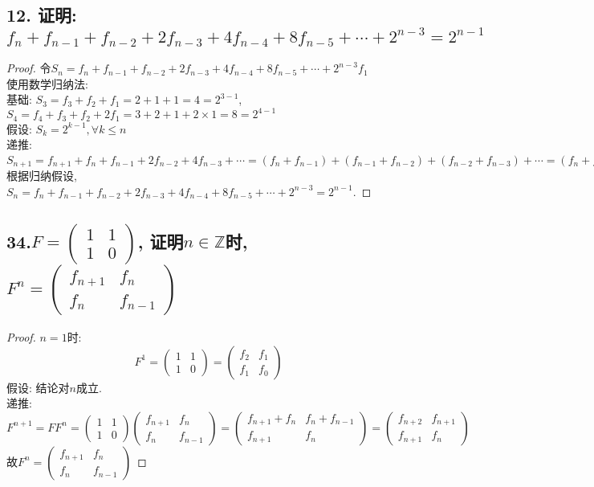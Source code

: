 \documentclass[UTF8, onecolumn, a4paper]{article}
\begin{document}
\subsection*{12. 证明: $f_n + f_{n-1} + f_{n-2} + 2f_{n-3} + 4f_{n-4} +8f_{n-5} + \cdots + 2^{n-3} = 2^{n-1}$}
\begin{proof}
令$S_n = f_n + f_{n-1} + f_{n-2} + 2f_{n-3} + 4f_{n-4} +8f_{n-5} + \cdots + 2^{n-3}f_1$\\
使用数学归纳法:\\
基础: $S_3 = f_3 + f_2 + f_1 = 2 + 1 + 1 = 4 = 2^{3 - 1}$, $S_4 = f_4 + f_3 + f_2  + 2f_1 = 3 + 2 + 1 + 2\times1 = 8 = 2^{4 - 1}$\\
假设: $S_k = 2^{k-1}, \forall k \leq n$\\
递推: $S_{n+1} = f_{n+1} + f_{n} + f_{n-1} + 2 f_{n-2} + 4f_{n-3} +\cdots = (f_{n} + f_{n-1}) + (f_{n-1} + f_{n-2}) + (f_{n-2} + f_{n-3}) + \cdots = (f_n + f_{n-1} + f_{n-2} + 2f_{n-3} + \cdots) + (f_{n-1} + f_{n-2} + f_{n-3} + 2f_{n-4}+\cdots) + 2^{n-2}f_1 = S_n + S_{n-1} + 2^{n-2} = 2^{n-1} + 2^{n-2} + 2^{n-2} = 2^n$\\
根据归纳假设,  $S_n = f_n + f_{n-1} + f_{n-2} + 2f_{n-3} + 4f_{n-4} +8f_{n-5} + \cdots + 2^{n-3} = 2^{n-1}$.
\end{proof}

\subsection*{34.$F = \begin{pmatrix}1& 1 \\1 &0 \end{pmatrix}$, 证明$n\in \mathbb{Z}$时, $F^n = \begin{pmatrix}f_{n+1}& f_{n} \\f_{n} &f_{n-1}\end{pmatrix}$}
\begin{proof}
$n = 1$时:
$$F^1 = \begin{pmatrix}1& 1 \\1 &0 \end{pmatrix} = \begin{pmatrix}f_2& f_1 \\f_1 &f_0 \end{pmatrix}$$
假设: 结论对$n$成立.\\
递推:
$$F^{n+1} = FF^n = \begin{pmatrix}1& 1 \\1 &0 \end{pmatrix} \begin{pmatrix}f_{n+1}& f_{n} \\f_{n} &f_{n-1} \end{pmatrix} = \begin{pmatrix}f_{n+1} + f_n& f_{n} + f_{n-1}\\ f_{n+1}&f_{n} \end{pmatrix} = \begin{pmatrix}f_{n+2}& f_{n+1} \\f_{n+1} &f_{n} \end{pmatrix}$$
故$F^n = \begin{pmatrix}f_{n+1}& f_{n} \\f_{n} &f_{n-1}\end{pmatrix}$
\end{proof}
\end{document}
